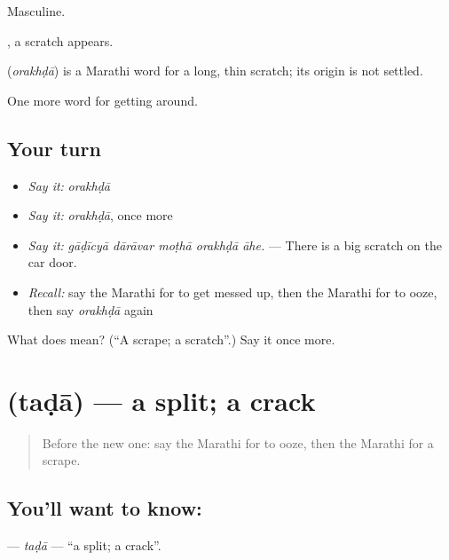 Masculine.

 , a scratch appears.

\begin{cousinweb}
\textbf{} (\emph{orakhḍā}) is a Marathi word for a long, thin scratch; its origin is not settled.
\end{cousinweb}

\begin{grammarlens}[title={What you've built}]
One more word for getting around.
\end{grammarlens}

\subsection*{Your turn}
\begin{itemize}
\raggedright
  \item \emph{Say it:} \emph{orakhḍā}
  \item \emph{Say it:} \emph{orakhḍā}, once more
  \item \emph{Say it:} \emph{gāḍīcyā dārāvar moṭhā orakhḍā āhe.} — There is a big scratch on the car door.
  \item \emph{Recall:} say the Marathi for to get messed up, then the Marathi for to ooze, then say \emph{orakhḍā} again
\end{itemize}

\begin{tcolorbox}[breakable,colback=teal!4,colframe=teal!35!black,title={Before you move on}]
What does  mean? (\textquotedblleft{}A scrape; a scratch\textquotedblright{}.) Say it once more.
\end{tcolorbox}
\section[\texorpdfstring{\mr{तडा} (taḍā)}{तडा (taḍā)}]{ (taḍā) — a split; a crack}

\label{lesson:MR-C433-tada}



\begin{quote}
Before the new one: say the Marathi for to ooze, then the Marathi for a scrape.
\end{quote}

\subsection*{You'll want to know: }
\textbf{} — \emph{taḍā} — \textquotedblleft{}a split; a crack\textquotedblright{}.

